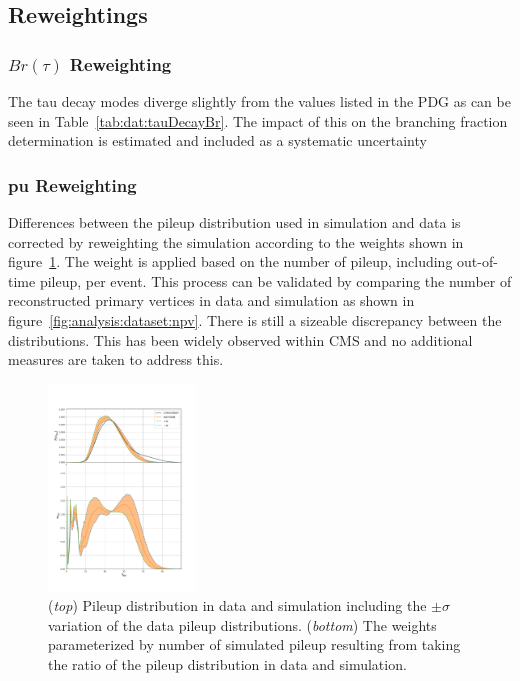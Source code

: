 
\FloatBarrier




\subsection{Reweightings}

\subsubsection{$Br(\tau)$ Reweighting}

The tau decay modes diverge slightly from the values listed in the PDG as can be seen in Table~\ref{tab:dat:tauDecayBr}.  The impact of this on the branching fraction determination is estimated and included as a systematic uncertainty

\FloatBarrier



\subsubsection{\acrfull{pu} Reweighting}

Differences between the pileup distribution used in simulation and data is corrected by reweighting the simulation according to the weights shown in figure~\ref{fig:analysis:dataset:pileup}. The weight is applied based on the number of pileup, including out-of-time pileup, per event.  This process can be validated by comparing the number of reconstructed primary vertices in data and simulation as shown in figure~\ref{fig:analysis:dataset:npv}. There is still a sizeable discrepancy between the distributions. This has been widely observed within CMS and no additional measures are taken to address this.


\begin{figure}[ht]
    \centering
    \includegraphics[width=0.35\textwidth]{chapters/Analysis/sectionDataset/figures/pileup_systematics.pdf}
    \caption{(\emph{top}) Pileup distribution in data and simulation including the $\pm\sigma$ variation of the data pileup distributions. (\emph{bottom}) The weights parameterized by number of simulated pileup resulting from taking the ratio of the pileup distribution in data and simulation.}
    \label{fig:analysis:dataset:pileup}
\end{figure}

